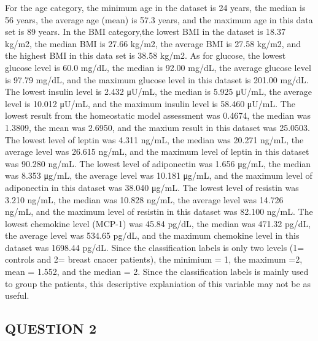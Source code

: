 \documentclass[
]{article}
\begin{document}
For the age category, the minimum age in the dataset is 24 years, the
median is 56 years, the average age (mean) is 57.3 years, and the
maximum age in this data set is 89 years. In the BMI category,the lowest
BMI in the dataset is 18.37 kg/m2, the median BMI is 27.66 kg/m2, the
average BMI is 27.58 kg/m2, and the highest BMI in this data set is
38.58 kg/m2. As for glucose, the lowest glucose level is 60.0 mg/dL, the
median is 92.00 mg/dL, the average glucose level is 97.79 mg/dL, and the
maximum glucose level in this dataset is 201.00 mg/dL. The lowest
insulin level is 2.432 μU/mL, the median is 5.925 μU/mL, the average
level is 10.012 μU/mL, and the maximum insulin level is 58.460 μU/mL.
The lowest result from the homeostatic model assessment was 0.4674, the
median was 1.3809, the mean was 2.6950, and the maxium result in this
dataset was 25.0503. The lowest level of leptin was 4.311 ng/mL, the
median was 20.271 ng/mL, the average level was 26.615 ng/mL, and the
maximum level of leptin in this dataset was 90.280 ng/mL. The lowest
level of adiponectin was 1.656 μg/mL, the median was 8.353 μg/mL, the
average level was 10.181 μg/mL, and the maximum level of adiponectin in
this dataset was 38.040 μg/mL. The lowest level of resistin was 3.210
ng/mL, the median was 10.828 ng/mL, the average level was 14.726 ng/mL,
and the maximum level of resistin in this dataset was 82.100 ng/mL. The
lowest chemokine level (MCP-1) was 45.84 pg/dL, the median was 471.32
pg/dL, the average level was 534.65 pg/dL, and the maximum chemokine
level in this dataset was 1698.44 pg/dL. Since the classification labels
is only two levels (1= controls and 2= breast cnacer patients), the
minimium = 1, the maximum =2, mean = 1.552, and the median = 2. Since
the classification labels is mainly used to group the patients, this
descriptive explaniation of this variable may not be as useful.

\hypertarget{question-2}{%
\subsection{QUESTION 2}\label{question-2}}
\end{document}
